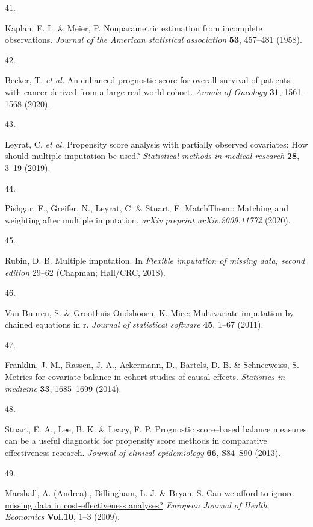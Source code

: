 \documentclass[
  letterpaper,
  DIV=11,
  numbers=noendperiod]{scrartcl}
\newlength{\cslhangindent}
\newlength{\csllabelwidth}
\newenvironment{CSLReferences}[2] %
 {\begin{list}{}{%
  \setlength{\itemindent}{0pt}
  \setlength{\leftmargin}{0pt}
  \setlength{\parsep}{0pt}
  \ifodd #1
   \setlength{\leftmargin}{\cslhangindent}
   \setlength{\itemindent}{-1\cslhangindent}
  \fi
  \setlength{\itemsep}{#2\baselineskip}}}
 {\end{list}}
\newcommand{\CSLLeftMargin}[1]{\parbox[t]{\csllabelwidth}{\strut#1\strut}}
\newcommand{\CSLRightInline}[1]{\parbox[t]{\linewidth - \csllabelwidth}{\strut#1\strut}}
\begin{document}
\begin{CSLReferences}{0}{0}
\CSLLeftMargin{41. }%
\CSLRightInline{Kaplan, E. L. \& Meier, P. Nonparametric estimation from
incomplete observations. \emph{Journal of the American statistical
association} \textbf{53}, 457--481 (1958).}

\CSLLeftMargin{42. }%
\CSLRightInline{Becker, T. \emph{et al.} An enhanced prognostic score
for overall survival of patients with cancer derived from a large
real-world cohort. \emph{Annals of Oncology} \textbf{31}, 1561--1568
(2020).}

\CSLLeftMargin{43. }%
\CSLRightInline{Leyrat, C. \emph{et al.} Propensity score analysis with
partially observed covariates: How should multiple imputation be used?
\emph{Statistical methods in medical research} \textbf{28}, 3--19
(2019).}

\CSLLeftMargin{44. }%
\CSLRightInline{Pishgar, F., Greifer, N., Leyrat, C. \& Stuart, E.
MatchThem:: Matching and weighting after multiple imputation.
\emph{arXiv preprint arXiv:2009.11772} (2020).}

\CSLLeftMargin{45. }%
\CSLRightInline{Rubin, D. B. Multiple imputation. In \emph{Flexible
imputation of missing data, second edition} 29--62 (Chapman; Hall/CRC,
2018).}

\CSLLeftMargin{46. }%
\CSLRightInline{Van Buuren, S. \& Groothuis-Oudshoorn, K. Mice:
Multivariate imputation by chained equations in r. \emph{Journal of
statistical software} \textbf{45}, 1--67 (2011).}

\CSLLeftMargin{47. }%
\CSLRightInline{Franklin, J. M., Rassen, J. A., Ackermann, D., Bartels,
D. B. \& Schneeweiss, S. Metrics for covariate balance in cohort studies
of causal effects. \emph{Statistics in medicine} \textbf{33}, 1685--1699
(2014).}

\CSLLeftMargin{48. }%
\CSLRightInline{Stuart, E. A., Lee, B. K. \& Leacy, F. P. Prognostic
score--based balance measures can be a useful diagnostic for propensity
score methods in comparative effectiveness research. \emph{Journal of
clinical epidemiology} \textbf{66}, S84--S90 (2013).}

\CSLLeftMargin{49. }%
\CSLRightInline{Marshall, A. (Andrea)., Billingham, L. J. \& Bryan, S.
\href{https://doi.org/10.1007/s10198-008-0129-y\%0A}{Can we afford to
ignore missing data in cost-effectiveness analyses?} \emph{European
Journal of Health Economics} \textbf{Vol.10}, 1--3 (2009).}


\end{CSLReferences}
\end{document}
